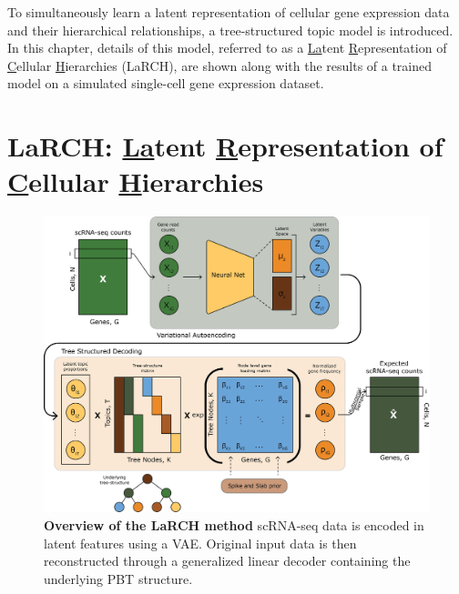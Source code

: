 \label{cha:larch}
To simultaneously learn a latent representation of cellular gene expression data and their hierarchical relationships, a tree-structured topic model is introduced. In this chapter, details of this model, referred to as a \underline{La}tent \underline{R}epresentation of \underline{C}ellular \underline{H}ierarchies (LaRCH), are shown along with the results of a trained model on a simulated single-cell gene expression dataset. 

\section[LaRCH]{LaRCH: \underline{La}tent \underline{R}epresentation of \underline{C}ellular \underline{H}ierarchies}

\begin{figure}
    \centering
    \includegraphics[width=\textwidth]{Figures/LaRCH_overview_0.png}
    \caption{\textbf{Overview of the LaRCH method} scRNA-seq data is encoded in latent features using a VAE. Original input data is then reconstructed through a generalized linear decoder containing the underlying PBT structure.}
    \label{fig:LaRCH}
\end{figure}

